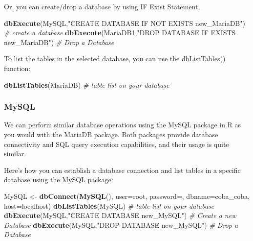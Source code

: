 \documentclass[
]{book}
\newenvironment{Shaded}{\begin{snugshade}}{\end{snugshade}}
\newcommand{\AttributeTok}[1]{\textcolor[rgb]{0.13,0.29,0.53}{#1}}
\newcommand{\CommentTok}[1]{\textcolor[rgb]{0.56,0.35,0.01}{\textit{#1}}}
\newcommand{\FunctionTok}[1]{\textcolor[rgb]{0.13,0.29,0.53}{\textbf{#1}}}
\newcommand{\NormalTok}[1]{#1}
\newcommand{\OtherTok}[1]{\textcolor[rgb]{0.56,0.35,0.01}{#1}}
\newcommand{\StringTok}[1]{\textcolor[rgb]{0.31,0.60,0.02}{#1}}
\begin{document}
Or, you can create/drop a database by using IF Exist Statement,

\begin{Shaded}
\begin{Highlighting}[]
\FunctionTok{dbExecute}\NormalTok{(MySQL,}\StringTok{"CREATE DATABASE IF NOT EXISTS new\_MariaDB"}\NormalTok{) }\CommentTok{\# create a database}
\FunctionTok{dbExecute}\NormalTok{(MariaDB1,}\StringTok{"DROP DATABASE IF EXISTS new\_MariaDB"}\NormalTok{)    }\CommentTok{\# Drop a Database}
\end{Highlighting}
\end{Shaded}

To list the tables in the selected database, you can use the dbListTables() function:

\begin{Shaded}
\begin{Highlighting}[]
\FunctionTok{dbListTables}\NormalTok{(MariaDB)                          }\CommentTok{\# table list on your database}
\end{Highlighting}
\end{Shaded}

\hypertarget{mysql}{%
\subsubsection*{MySQL}\label{mysql}}

We can perform similar database operations using the MySQL package in R as you would with the MariaDB package. Both packages provide database connectivity and SQL query execution capabilities, and their usage is quite similar.

Here's how you can establish a database connection and list tables in a specific database using the MySQL package:

\begin{Shaded}
\begin{Highlighting}[]
\NormalTok{MySQL }\OtherTok{\textless{}{-}} \FunctionTok{dbConnect}\NormalTok{(}\FunctionTok{MySQL}\NormalTok{(), }
                  \AttributeTok{user=}\StringTok{\textquotesingle{}root\textquotesingle{}}\NormalTok{,}
                  \AttributeTok{password=}\StringTok{\textquotesingle{}\textquotesingle{}}\NormalTok{, }
                  \AttributeTok{dbname=}\StringTok{\textquotesingle{}coba\_coba\textquotesingle{}}\NormalTok{, }
                  \AttributeTok{host=}\StringTok{\textquotesingle{}localhost\textquotesingle{}}\NormalTok{)}
\FunctionTok{dbListTables}\NormalTok{(MySQL)                               }\CommentTok{\# table list on your database}
\FunctionTok{dbExecute}\NormalTok{(MySQL,}\StringTok{"CREATE DATABASE new\_MySQL"}\NormalTok{)      }\CommentTok{\# Create a new Database}
\FunctionTok{dbExecute}\NormalTok{(MySQL,}\StringTok{"DROP DATABASE new\_MySQL"}\NormalTok{)        }\CommentTok{\# Drop a Database}
\end{Highlighting}
\end{Shaded}
\end{document}
